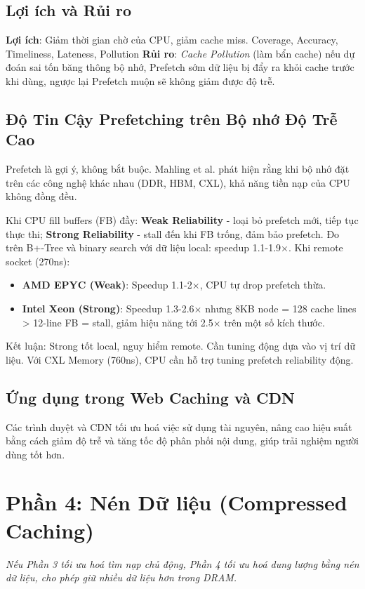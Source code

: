 \documentclass[10pt,twocolumn,a4paper]{article}
\begin{document}
\subsection{Lợi ích và Rủi ro}
\textbf{Lợi ích}: Giảm thời gian chờ của CPU, giảm cache miss.
 Coverage, Accuracy, Timeliness, Lateness, Pollution
\textbf{Rủi ro}: \textit{Cache Pollution} (làm bẩn cache) nếu dự đoán sai tốn băng thông bộ nhớ, Prefetch sớm dữ liệu bị đẩy ra khỏi cache trước khi dùng, ngược lại Prefetch muộn sẽ không giảm được độ trễ.

\subsection{Độ Tin Cậy Prefetching trên Bộ nhớ Độ Trễ Cao}
Prefetch là gợi ý, không bắt buộc. Mahling et al. \cite{mahling2025fetch} phát hiện rằng khi bộ nhớ đặt trên các công nghệ khác nhau (DDR, HBM, CXL), khả năng tiền nạp của CPU không đồng đều.

Khi CPU fill buffers (FB) đầy: \textbf{Weak Reliability} - loại bỏ prefetch mới, tiếp tục thực thi; \textbf{Strong Reliability} - stall đến khi FB trống, đảm bảo prefetch. Đo trên B+-Tree và binary search với dữ liệu local: speedup 1.1-1.9×. Khi remote socket (270ns):
\begin{itemize}
    \item \textbf{AMD EPYC (Weak)}: Speedup 1.1-2×, CPU tự drop prefetch thừa.
    \item \textbf{Intel Xeon (Strong)}: Speedup 1.3-2.6× nhưng 8KB node = 128 cache lines > 12-line FB = stall, giảm hiệu năng tới 2.5× trên một số kích thước.
\end{itemize}
Kết luận: Strong tốt local, nguy hiểm remote. Cần tuning động dựa vào vị trí dữ liệu. Với CXL Memory (760ns), CPU cần hỗ trợ tuning prefetch reliability động.

\subsection{Ứng dụng trong Web Caching và CDN}
Các trình duyệt và CDN tối ưu hoá việc sử dụng tài nguyên, nâng cao hiệu suất bằng cách giảm độ trễ và tăng tốc độ phân phối nội dung, giúp trải nghiệm người dùng tốt hơn. 

\section{Phần 4: Nén Dữ liệu (Compressed Caching)}
\textit{Nếu Phần 3 tối ưu hoá tìm nạp chủ động, Phần 4 tối ưu hoá dung lượng bằng nén dữ liệu, cho phép giữ nhiều dữ liệu hơn trong DRAM.}
\end{document}

